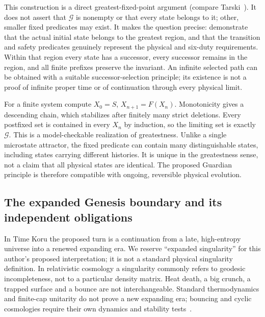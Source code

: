 \documentclass[11pt,a4paper]{article}
\begin{document}
This construction is a direct greatest-fixed-point argument (compare Tarski~\cite{tarski}). It does not assert that $\mathcal G$ is nonempty or that every state belongs to it; other, smaller fixed predicates may exist. It makes the question precise: demonstrate that the actual initial state belongs to the greatest region, and that the transition and safety predicates genuinely represent the physical and six-duty requirements. Within that region every state has a successor, every successor remains in the region, and all finite prefixes preserve the invariant. An infinite selected path can be obtained with a suitable successor-selection principle; its existence is not a proof of infinite proper time or of continuation through every physical limit.

For a finite system compute $X_0=S$, $X_{n+1}=F(X_n)$. Monotonicity gives a descending chain, which stabilizes after finitely many strict deletions. Every postfixed set is contained in every $X_n$ by induction, so the limiting set is exactly $\mathcal G$. This is a model-checkable realization of greatestness. Unlike a single microstate attractor, the fixed predicate can contain many distinguishable states, including states carrying different histories. It is unique in the greatestness sense, not a claim that all physical states are identical. The proposed Guardian principle is therefore compatible with ongoing, reversible physical evolution.

\subsection{The expanded Genesis boundary and its independent obligations}
In Time Koru the proposed turn is a continuation from a late, high-entropy universe into a renewed expanding era. We reserve ``expanded singularity'' for this author's proposed interpretation; it is not a standard physical singularity definition. In relativistic cosmology a singularity commonly refers to geodesic incompleteness, not to a particular density matrix. Heat death, a big crunch, a trapped surface and a bounce are not interchangeable. Standard thermodynamics and finite-cap unitarity do not prove a new expanding era; bouncing and cyclic cosmologies require their own dynamics and stability tests~\cite{bounce}.
\end{document}
